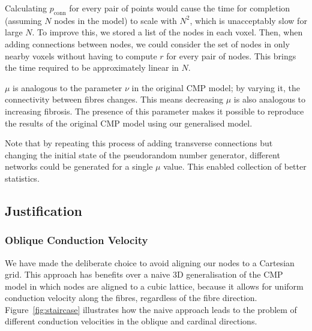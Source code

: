Calculating $p_\text{conn}$ for every pair of points would cause the time for completion (assuming $N$ nodes in the model) to scale with $N^2$, which is unacceptably slow for large $N$. To improve this, we stored a list of the nodes in each voxel. Then, when adding connections between nodes, we could consider the set of nodes in only nearby voxels without having to compute $r$ for every pair of nodes. This brings the time required to be approximately linear in $N$.

$\mu$ is analogous to the parameter $\nu$ in the original CMP model; by varying it, the connectivity between fibres changes. This means decreasing $\mu$ is also analogous to increasing fibrosis. The presence of this parameter makes it possible to reproduce the results of the original CMP model using our generalised model.

Note that by repeating this process of adding transverse connections but changing the initial state of the pseudorandom number generator, different networks could be generated for a single $\mu$ value. This enabled collection of better statistics.

\subsection{Justification}

\subsubsection*{Oblique Conduction Velocity}

We have made the deliberate choice to avoid aligning our nodes to a Cartesian grid.
This approach has benefits over a naive 3D generalisation of the CMP model in which nodes are aligned to a cubic lattice, because it allows for uniform conduction velocity along the fibres, regardless of the fibre direction. Figure~\ref{fig:staircase} illustrates how the naive approach leads to the problem of different conduction velocities in the oblique and cardinal directions. 


